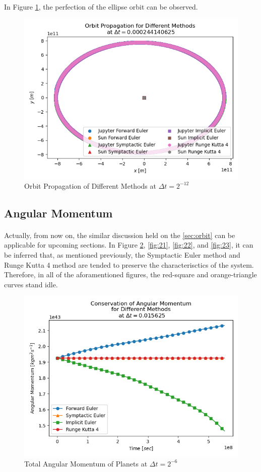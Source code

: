 \documentclass[letterpaper,12pt]{article}
\begin{document}
\paragraph{} In Figure \ref{fig:13}, the perfection of the ellipse orbit can be observed.
    \begin{figure}[H]
    \centerline{\includegraphics[width=0.7\linewidth]{figures/13.png}}
    \caption{Orbit Propagation of Different Methods at $\Delta t = 2^{-12}$}
    \label{fig:13}
    \end{figure}
\label{sec:orbit}
\subsection{Angular Momentum}  

\paragraph{} Actually, from now on, the similar discussion held on the \ref{sec:orbit} can be applicable for upcoming sections. In Figure \ref{fig:20}, \ref{fig:21}, \ref{fig:22}, and \ref{fig:23}, it can be inferred that, as mentioned previously, the Symptactic Euler method and Runge Kutta 4 method are tended to preserve the characterisctics of the system. Therefore, in all of the aforamentioned figures, the red-square and orange-triangle curves stand idle.  
    \begin{figure}[H]
    \centerline{\includegraphics[width=0.7\linewidth]{figures/20.png}}
    \caption{Total Angular Momentum of Planets at $\Delta t = 2^{-6}$}
    \label{fig:20}
    \end{figure}
    
\end{document}
